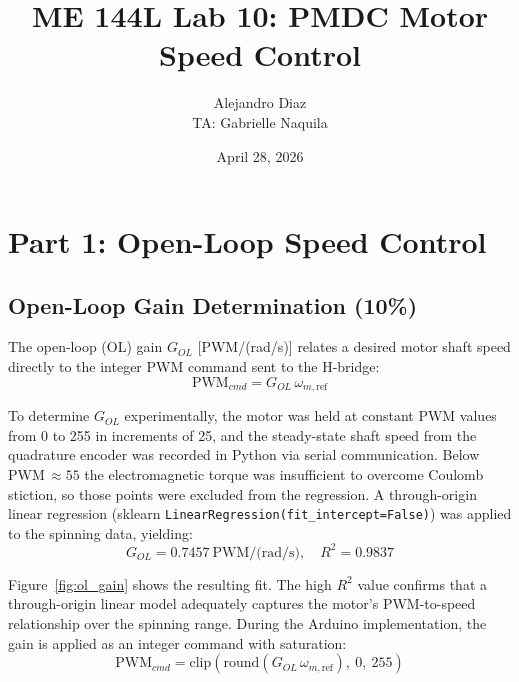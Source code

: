 \documentclass{article}
\title{\textbf{ME 144L Lab 10: PMDC Motor Speed Control}}
\author{Alejandro Diaz \\ TA: Gabrielle Naquila}
\date{April 28, 2026}
\begin{document}
\maketitle

\tableofcontents
\newpage

\section{Part 1: Open-Loop Speed Control}

\subsection{Open-Loop Gain Determination (10\%)}

The open-loop (OL) gain $G_{OL}$ [PWM/(rad/s)] relates a desired motor shaft speed directly to the integer PWM command sent to the H-bridge:
\begin{equation}
    \mathrm{PWM}_{cmd} = G_{OL}\,\omega_{m,\mathrm{ref}}
    \label{eq:ol_gain}
\end{equation}

To determine $G_{OL}$ experimentally, the motor was held at constant PWM values from 0 to 255 in increments of 25, and the steady-state shaft speed from the quadrature encoder was recorded in Python via serial communication. Below PWM\,$\approx 55$ the electromagnetic torque was insufficient to overcome Coulomb stiction, so those points were excluded from the regression. A through-origin linear regression (sklearn \texttt{LinearRegression(fit\_intercept=False)}) was applied to the spinning data, yielding:
\begin{equation}
    \boxed{\; G_{OL} = 0.7457~\text{PWM/(rad/s)}, \quad R^2 = 0.9837 \;}
    \label{eq:ol_gain_result}
\end{equation}

Figure~\ref{fig:ol_gain} shows the resulting fit. The high $R^2$ value confirms that a through-origin linear model adequately captures the motor's PWM-to-speed relationship over the spinning range. During the Arduino implementation, the gain is applied as an integer command with saturation:
\begin{equation}
    \mathrm{PWM}_{cmd} = \mathrm{clip}\!\left(\mathrm{round}(G_{OL}\,\omega_{m,\mathrm{ref}}),\ 0,\ 255\right)
    \label{eq:ol_cmd}
\end{equation}
\end{document}
